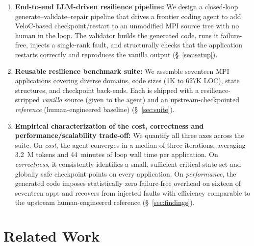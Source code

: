\documentclass[conference]{IEEEtran}
\begin{document}
\begin{enumerate}[topsep=0pt,itemsep=0pt,leftmargin=12pt]
\item \textbf{End-to-end LLM-driven resilience pipeline:}
We design a closed-loop generate--validate--repair pipeline that drives a frontier coding agent to add VeloC-based checkpoint/restart to an unmodified MPI source tree with no human in the loop. The validator builds the generated code, runs it failure-free, injects a single-rank fault, and structurally checks that the application restarts correctly and reproduces the vanilla output (\S~\ref{sec:setup}).

\item \textbf{Reusable resilience benchmark suite:} We assemble seventeen MPI applications covering diverse domains, code sizes (1K to 627K LOC), state structures, and checkpoint back-ends. Each is shipped with a resilience-stripped \emph{vanilla} source (given to the agent) and an upstream-checkpointed \emph{reference} (human-engineered baseline) (\S~\ref{sec:suite}).

\item \textbf{Empirical characterization of the cost, correctness and performance/scalability trade-off:} We quantify all three axes across the suite. On \emph{cost}, the agent converges in a median of three iterations, averaging 3.2~M tokens and 44~minutes of loop wall time per application. On \emph{correctness}, it consistently identifies a small, sufficient critical-state set and globally safe checkpoint points on every application. On \emph{performance}, the generated code imposes statistically zero failure-free overhead on sixteen of seventeen apps and recovers from injected faults with efficiency comparable to the upstream human-engineered reference (\S~\ref{sec:findings}).
\end{enumerate}


\section{Related Work}
\end{document}
